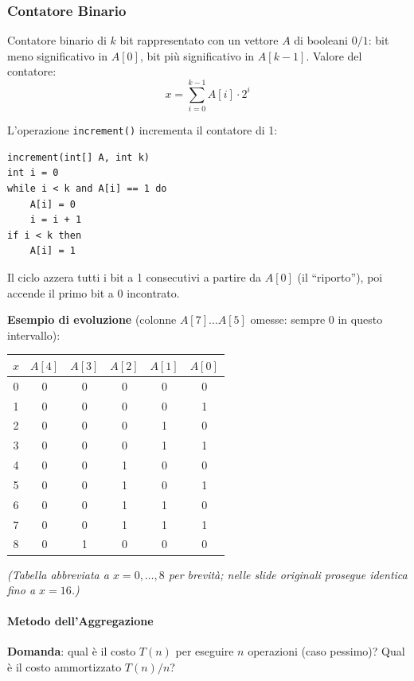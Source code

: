 \documentclass[12pt, a4paper]{article}
\begin{document}
\subsubsection{Contatore Binario}

\begin{tcolorbox}[colback=lightergray!10, colframe=tocsec, title=\textbf{Definizione: Contatore Binario}]
Contatore binario di $k$ bit rappresentato con un vettore $A$ di booleani $0/1$: bit meno significativo in $A[0]$, bit più significativo in $A[k-1]$. Valore del contatore:
$$x = \sum_{i=0}^{k-1} A[i]\cdot 2^i$$
\end{tcolorbox}

L'operazione \texttt{increment()} incrementa il contatore di 1:
\begin{verbatim}
increment(int[] A, int k)
int i = 0
while i < k and A[i] == 1 do
    A[i] = 0
    i = i + 1
if i < k then
    A[i] = 1
\end{verbatim}
Il ciclo azzera tutti i bit a 1 consecutivi a partire da $A[0]$ (il ``riporto''), poi accende il primo bit a 0 incontrato.

\textbf{Esempio di evoluzione} (colonne $A[7]\ldots A[5]$ omesse: sempre $0$ in questo intervallo):
\begin{center}
\begin{tabular}{c|ccccc}
\toprule
$x$ & $A[4]$ & $A[3]$ & $A[2]$ & $A[1]$ & $A[0]$ \\
\midrule
0 & 0&0&0&0&0 \\
1 & 0&0&0&0&1 \\
2 & 0&0&0&1&0 \\
3 & 0&0&0&1&1 \\
4 & 0&0&1&0&0 \\
5 & 0&0&1&0&1 \\
6 & 0&0&1&1&0 \\
7 & 0&0&1&1&1 \\
8 & 0&1&0&0&0 \\
\bottomrule
\end{tabular}
\end{center}
\textit{(Tabella abbreviata a $x=0,\ldots,8$ per brevità; nelle slide originali prosegue identica fino a $x=16$.)}

\paragraph{Metodo dell'Aggregazione}

\textbf{Domanda}: qual è il costo $T(n)$ per eseguire $n$ operazioni (caso pessimo)? Qual è il costo ammortizzato $T(n)/n$?
\end{document}
